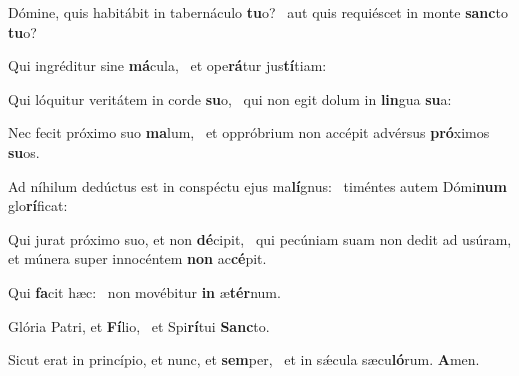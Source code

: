 \item Dómine, quis habitábit in tabernáculo \textbf{tu}o?~\psstar{} aut quis requiéscet in monte \textbf{sanc}to \textbf{tu}o?
\item Qui ingréditur sine \textbf{má}cula,~\psstar{} et ope\textbf{rá}tur jus\textbf{tí}tiam:
\item Qui lóquitur veritátem in corde \textbf{su}o,~\psstar{} qui non egit dolum in \textbf{lin}gua \textbf{su}a:
\item Nec fecit próximo suo \textbf{ma}lum,~\psstar{} et oppróbrium non accépit advérsus \textbf{pró}ximos \textbf{su}os.
\item Ad níhilum dedúctus est in conspéctu ejus ma\textbf{lí}gnus:~\psstar{} timéntes autem Dómi\textbf{num} glo\textbf{rí}ficat:
\item Qui jurat próximo suo, et non \textbf{dé}cipit,~\psstar{} qui pecúniam suam non dedit ad usúram, et múnera super innocéntem \textbf{non} ac\textbf{cé}pit.
\item Qui \textbf{fa}cit hæc:~\psstar{} non movébitur \textbf{in} æ\textbf{tér}num.
\item Glória Patri, et \textbf{Fí}lio,~\psstar{} et Spi\textbf{rí}tui \textbf{Sanc}to.
\item Sicut erat in princípio, et nunc, et \textbf{sem}per,~\psstar{} et in sǽcula sæcu\textbf{ló}rum. \textbf{A}men.
